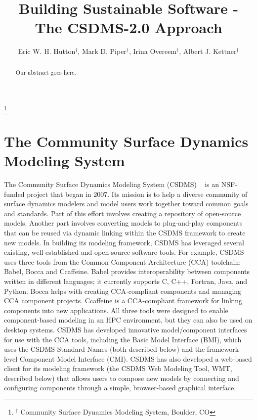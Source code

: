 \documentclass[11pt, oneside]{amsart}
\begin{document}
\title[]{Building Sustainable Software - The CSDMS-2.0 Approach}

\author{Eric W. H. Hutton$^{\dag}$, Mark D. Piper$^{\dag}$, Irina Overeem$^{\dag}$, Albert J. Kettner$^{\dag}$}
\thanks{{}$^{\dag}$ Community Surface Dynamics Modeling System, Boulder, CO}

\begin{abstract}

Our abstract goes here.

\end{abstract}

\maketitle

\section{The Community Surface Dynamics Modeling System}

The Community Surface Dynamics Modeling System (CSDMS)
~\cite{peckham2012component}
is an NSF-funded project that began in 2007. Its mission is to help a diverse
community of surface dynamics modelers and model users work together toward
common goals and standards. Part of this effort involves creating a repository
of open-source models. Another part involves converting models to plug-and-play
components that can be reused via dynamic linking within the CSDMS framework to
create new models. In building its modeling framework, CSDMS has leveraged
several existing, well-established and open-source software tools. For example,
CSDMS uses three tools from the Common Component Architecture (CCA) toolchain:
Babel, Bocca and Ccaffeine. Babel provides interoperability between components
written in different languages; it currently supports C, C++, Fortran, Java,
and Python. Bocca helps with creating CCA-compliant components and managing CCA
component projects. Ccaffeine is a CCA-compliant framework for linking
components into new applications. All three tools were designed to enable
component-based modeling in an HPC environment, but they can also be used on
desktop systems. CSDMS has developed innovative model/component interfaces for
use with the CCA tools, including the Basic Model Interface (BMI), which uses
the CSDMS Standard Names (both described below) and the framework-level
Component Model Interface (CMI). CSDMS has also developed a web-based client
for its modeling framework (the CSDMS Web Modeling Tool, WMT, described below)
that allows users to compose new models by connecting and configuring
components through a simple, browser-based graphical interface.
\end{document}

